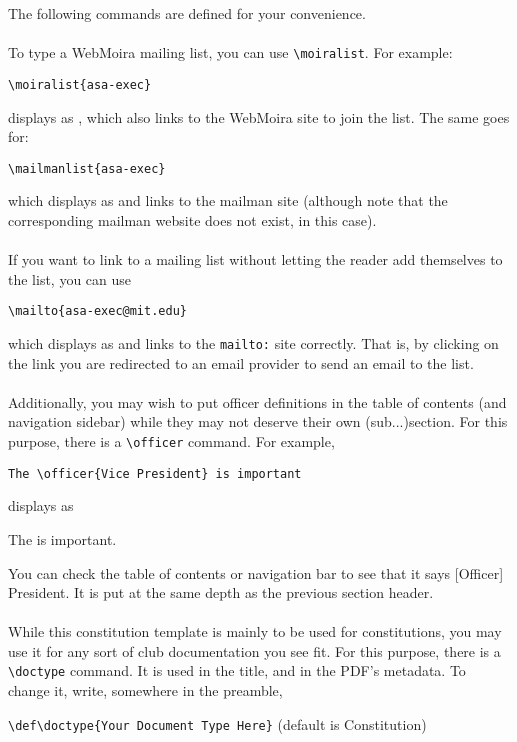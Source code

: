 \documentclass{constitution}
\begin{document}
The following commands are defined for your convenience.
\\\\
To type a WebMoira mailing list, you can use \verb|\moiralist|.
For example:\par
    \quad \verb|\moiralist{asa-exec}|\par
displays as , which also links to the WebMoira site to join the list.
The same goes for: \par
    \quad \verb|\mailmanlist{asa-exec}|\par
which displays as  and links to the mailman site (although note that the corresponding mailman website does not exist, in this case).
\\\\
If you want to link to a mailing list without letting the reader add themselves to the list, you can use\par
\quad \verb|\mailto{asa-exec@mit.edu}|\par
which displays as  and links to the \verb|mailto:| site correctly.
That is, by clicking on the link you are redirected to an email provider to send an email to the list.
\\\\
Additionally, you may wish to put officer definitions in the table of contents (and navigation sidebar) while they may not deserve their own (sub...)section.
For this purpose, there is a \verb|\officer| command.
For example,\par
\quad \verb|The \officer{Vice President} is important|\par
displays as\par
\quad The  is important.\par
You can check the table of contents or navigation bar to see that it says [Officer] President.
It is put at the same depth as the previous section header.
\\\\
While this constitution template is mainly to be used for constitutions, you may use it for any sort of club documentation you see fit.
For this purpose, there is a \verb|\doctype| command.
It is used in the title, and in the PDF's metadata.
To change it, write, somewhere in the preamble,\par
\quad \verb|\def\doctype{Your Document Type Here}| (default is Constitution)

\label{headers}
\end{document}
